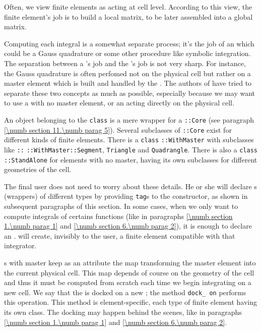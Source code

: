 Often, we view finite elements as acting at cell level.
According to this view, the finite element's job is to build a local matrix, to be later
assembled into a global matrix.

Computing each integral is a somewhat separate process; it's the job of an
{\small\tt{}}
which could be a Gauss quadrature or some other procedure like symbolic integration.
The separation between a {\small\tt{}}'s job and
the {\small\tt{}}'s job is not very sharp.
For instance, the Gauss quadrature is often perfomed not on the physical cell but rather
on a master element which is built and handled by the {\small\tt{}}.
The authors of {\maniFEM} have tried to separate these two concepts
as much as possible, especially because we may want to use a {\small\tt{}}
with no master element, or an {\small\tt{}} acting directly on the physical cell.

An object belonging to the {\small\tt class} {\small\tt{}} is a mere wrapper
for a {\small\tt{}::Core} (see paragraph \ref{\numb section 11.\numb parag 5}).
Several subclasses of {\small\tt{}::Core} exist for different
kinds of finite elements.
There is a {\small\tt class} {\small\tt{}::WithMaster} with subclasses like
{\small\tt{}::} {\small\tt::WithMaster::Segment}, {\small\tt Triangle} and
{\small\tt Quadrangle}.
There is also a {\small\tt class} {\small\tt{}::StandAlone} for elements
with no master, having its own subclasses for different geometries of the cell.

The final user does not need to worry about these details.
He or she will declare {\small\tt{}}s (wrappers) of different types
by providing {\small\tt\textcolor{tag}{tag}}s to the constructor, as shown in
subsequent paragraphs of this section.
In some cases, when we only want to compute integrals of certains functions
(like in paragraphs \ref{\numb section 1.\numb parag 1} and \ref{\numb section 6.\numb parag 2}),
it is enough to declare an {\small\tt{}}.
{\ManiFEM} will create, invisibly to the user, a finite element compatible with that
integrator.

{\small\tt{}}s with master keep as an attribute the map transforming
the master element into the current physical cell.
This map depends of course on the geometry of the cell and thus it must be computed from
scratch each time we begin integrating on a new cell.
We say that the {\small\tt{}} is docked on a new {\small\tt{}};
the method {\small\tt dock\_\,on} performs this operation.
This method is element-specific, each type of finite element having its own class.
The docking may happen behind the scenes, like in paragraphs \ref{\numb section 1.\numb parag 1}
and \ref{\numb section 6.\numb parag 2}.

